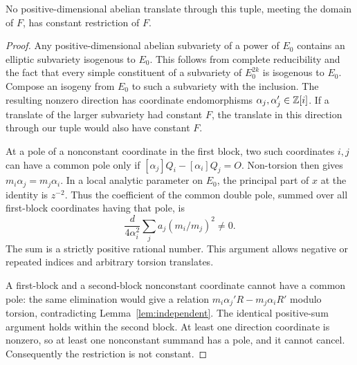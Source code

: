 \documentclass[11pt,a4paper]{article}
\begin{document}
\begin{lemma}\label{lem:translates}
No positive-dimensional abelian translate through this tuple, meeting
the domain of $F$, has constant restriction of $F$.
\end{lemma}
\begin{proof}
Any positive-dimensional abelian subvariety of a power of $E_0$ contains
an elliptic subvariety isogenous to $E_0$. This follows from complete
reducibility and the fact that every simple constituent of a subvariety
of $E_0^{2k}$ is isogenous to $E_0$. Compose an isogeny from $E_0$ to
such a subvariety with the inclusion. The resulting nonzero direction
has coordinate endomorphisms $\alpha_j,\alpha_j'\in\mathbb Z[i]$.
If a translate of the larger subvariety had constant $F$, the translate
in this direction through our tuple would also have constant $F$.

At a pole of a nonconstant coordinate in the first block, two such
coordinates $i,j$ can have a common pole only if
$[\alpha_j]Q_i-[\alpha_i]Q_j=O$. Non-torsion then gives
$m_i\alpha_j=m_j\alpha_i$. In a local analytic parameter on $E_0$,
the principal part of $x$ at the identity is $z^{-2}$. Thus the
coefficient of the common double pole, summed over all first-block
coordinates having that pole, is
\[
 \frac d{4\alpha_i^2}\sum_j a_j(m_i/m_j)^2\ne0.
\]
The sum is a strictly positive rational number. This argument allows
negative or repeated indices and arbitrary torsion translates.

A first-block and a second-block nonconstant coordinate cannot have
a common pole: the same elimination would give a relation
$m_i\alpha_j'R-m_j\alpha_iR'$ modulo torsion, contradicting
Lemma~\ref{lem:independent}. The identical positive-sum argument holds
within the second block. At least one direction coordinate is nonzero,
so at least one nonconstant summand has a pole, and it cannot cancel.
Consequently the restriction is not constant.
\end{proof}
\end{document}
